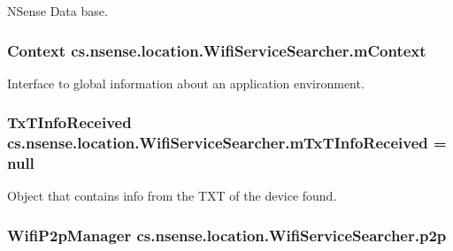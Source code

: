 N\-Sense Data base. \hypertarget{classcs_1_1nsense_1_1location_1_1_wifi_service_searcher_aa067e3bd1682b7cb95f671a19e662c42}{
\subsubsection[{m\-Context}]{\setlength{\rightskip}{0pt plus 5cm}Context cs.\-nsense.\-location.\-Wifi\-Service\-Searcher.\-m\-Context\hspace{0.3cm}{\ttfamily [private]}}}\label{classcs_1_1nsense_1_1location_1_1_wifi_service_searcher_aa067e3bd1682b7cb95f671a19e662c42}
Interface to global information about an application environment. \hypertarget{classcs_1_1nsense_1_1location_1_1_wifi_service_searcher_a208c19d0746aaf63777a00a65b8a5803}{
\subsubsection[{m\-Tx\-T\-Info\-Received}]{\setlength{\rightskip}{0pt plus 5cm}Tx\-T\-Info\-Received cs.\-nsense.\-location.\-Wifi\-Service\-Searcher.\-m\-Tx\-T\-Info\-Received = null\hspace{0.3cm}{\ttfamily [private]}}}\label{classcs_1_1nsense_1_1location_1_1_wifi_service_searcher_a208c19d0746aaf63777a00a65b8a5803}
Object that contains info from the T\-X\-T of the device found. \hypertarget{classcs_1_1nsense_1_1location_1_1_wifi_service_searcher_a4d7da832573db92080e064fe61068dc1}{
\subsubsection[{p2p}]{\setlength{\rightskip}{0pt plus 5cm}Wifi\-P2p\-Manager cs.\-nsense.\-location.\-Wifi\-Service\-Searcher.\-p2p\hspace{0.3cm}{\ttfamily [private]}}}\label{classcs_1_1nsense_1_1location_1_1_wifi_service_searcher_a4d7da832573db92080e064fe61068dc1}
